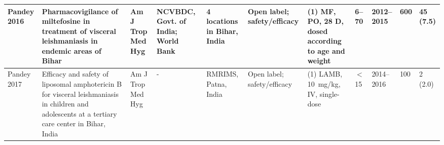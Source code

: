 \begin{ThreePartTable}
\begin{longtable}[c]{L{1.5cm} L{3.5cm} L{1.3cm} L{2.5cm} L{2.5cm} L{2.5cm} L{3cm} L{1.5cm} L{1cm} L{1cm} L{1.3cm}}
    Pandey 2016\cite{pandey2016}                    & Pharmacovigilance of miltefosine in treatment of visceral leishmaniasis in endemic areas of Bihar                                                                                                                           & Am J Trop Med Hyg        & NCVBDC, Govt. of India; World Bank                                                   & 4 locations in Bihar, India                       & Open label; safety/efficacy                                                        & (1) MF, PO, 28 D, dosed according to age and weight                                                                                                                                                        & 6--70       & 2012--2015   & 600          & 45 (7.5)                                                                                                                                                                                                                                                                                                                                                                                                                                                                                                                                                                                       \\ \midrule
    Pandey 2017\cite{pandey2017}                    & Efficacy and safety of liposomal amphotericin B for visceral leishmaniasis in children and adolescents at a tertiary care center in Bihar, India                                                                            & Am J Trop  Med Hyg       & -                                                                                    & RMRIMS, Patna, India                              & Open label; safety/efficacy                                                        & (1) LAMB, 10~mg/kg, IV, single-dose                                                                                                                                                                                   & $<$15       & 2014--2016   & 100          & 2 (2.0)                                                                                                                                                                                                                                                                                                                                                                                                                                                                                                                                                                                        \\ \midrule

\end{longtable}
\end{ThreePartTable}

